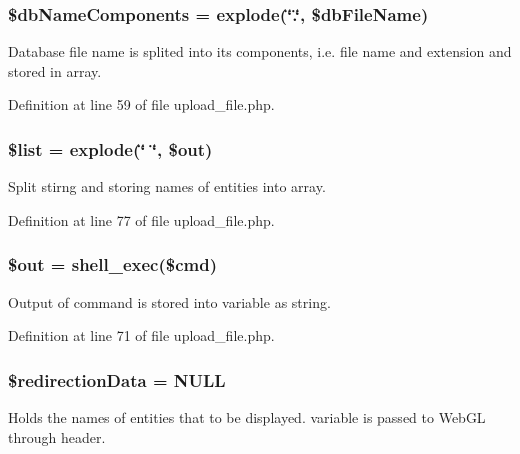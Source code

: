 \hypertarget{upload__file_8php_a82064fc59286d59cc519da100ff37a03}{
\subsubsection[{\$db\-Name\-Components}]{\setlength{\rightskip}{0pt plus 5cm}\$db\-Name\-Components = explode(\char`\"{}.\char`\"{}, \$db\-File\-Name)}}\label{upload__file_8php_a82064fc59286d59cc519da100ff37a03}
Database file name is splited into its components, i.\-e. file name and extension and stored in array. 

Definition at line 59 of file upload\-\_\-file.\-php.

\hypertarget{upload__file_8php_a358b00350db3d8f227d500337cc437af}{
\subsubsection[{\$list}]{\setlength{\rightskip}{0pt plus 5cm}\$list = explode(\char`\"{} \char`\"{}, \$out)}}\label{upload__file_8php_a358b00350db3d8f227d500337cc437af}
Split stirng and storing names of entities into array. 

Definition at line 77 of file upload\-\_\-file.\-php.

\hypertarget{upload__file_8php_a48cb304902320d173a4eaa41543327b9}{
\subsubsection[{\$out}]{\setlength{\rightskip}{0pt plus 5cm}\$out = shell\-\_\-exec(\$cmd)}}\label{upload__file_8php_a48cb304902320d173a4eaa41543327b9}
Output of command is stored into variable as string. 

Definition at line 71 of file upload\-\_\-file.\-php.

\hypertarget{upload__file_8php_a4bfc4abb42c1a5571cc275eb8dc0de4c}{
\subsubsection[{\$redirection\-Data}]{\setlength{\rightskip}{0pt plus 5cm}\$redirection\-Data = N\-U\-L\-L}}\label{upload__file_8php_a4bfc4abb42c1a5571cc275eb8dc0de4c}
Holds the names of entities that to be displayed. variable is passed to Web\-G\-L through header. 

